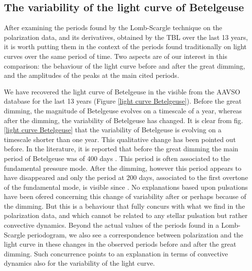 \documentclass{aa}
\begin{document}
\subsection{The variability of the light curve of Betelgeuse}

After examining the periods found by the Lomb-Scargle technique on the polarization data, and its derivatives, obtained by the TBL over the last 
13 years, it is worth putting them in the context of the periods found traditionally on light curves over the same period of time. Two aspects 
are of our interest in this comparison: the behaviour of the light curve before and after the great dimming, and the amplitudes of the peaks 
at the main cited periods.


We have recovered the light curve of Betelgeuse in the visible from the AAVSO database for the last 13 years (Figure \ref{light curve Betelgeuse}).
Before the great dimming, the magnitude of Betelgeuse evolves on a timescale of a year, whereas after the dimming, the variability of Betelgeuse has changed. 
It is clear from fig. \ref{light curve Betelgeuse} that the 
variability of Betelgeuse is evolving on a timescale shorter than one year. This qualitative change has been pointed out before.
In the literature, it is reported that before the great dimming the main period of Betelgeuse was of 400 days \citep{kiss_variility_2006}. 
This period is often associated to the fundamental pressure mode. After the dimming, however this period appears to have disappeared 
and only the period at 200 days,  associated to the first overtone of the fundamental mode, is visible since \citep{XXX}.
No explanations based upon pulsations have been ofered concerning this change of variability after or perhaps because of the dimming. But this 
is a behaviour that fully concurs with what we find in the polarization data, and which cannot be related to any stellar pulsation but rather 
convective dynamics. Beyond the actual values of the periods found in a Lomb-Scargle periodogram, we also see a correspondence between polarization 
and the light curve in these changes in the observed periods before and after the great dimming. Such concurrence points to an explanation 
in terms of convective dynamics also for the variability of the light curve.
\end{document}
